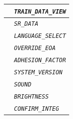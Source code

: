 \documentclass{template/openetcs}
\begin{document}
\begin{itemize}
\begin{longtable}{|l|l|}
				\hline
				
				&	\begin{minipage}[t]{0.78\linewidth} \emph{\texttt{TRAIN\_DATA\_VIEW}} \end{minipage} \\
				
				\hline
				
				&	\begin{minipage}[t]{0.78\linewidth} \emph{\texttt{SR\_DATA}} \end{minipage} \\
				
				\hline
				
				&	\begin{minipage}[t]{0.78\linewidth} \emph{\texttt{LANGUAGE\_SELECT}} \end{minipage} \\
				
				\hline
				
				&	\begin{minipage}[t]{0.78\linewidth} \emph{\texttt{OVERRIDE\_EOA}} \end{minipage} \\
				
				\hline
				
				&	\begin{minipage}[t]{0.78\linewidth} \emph{\texttt{ADHESION\_FACTOR}} \end{minipage} \\
				
				\hline
				
				&	\begin{minipage}[t]{0.78\linewidth} \emph{\texttt{SYSTEM\_VERSION}} \end{minipage} \\
				
				\hline
				
				&	\begin{minipage}[t]{0.78\linewidth} \emph{\texttt{SOUND}} \end{minipage} \\
				
				\hline
				
				&	\begin{minipage}[t]{0.78\linewidth} \emph{\texttt{BRIGHTNESS}} \end{minipage} \\
				
				\hline
				
				&	\begin{minipage}[t]{0.78\linewidth} \emph{\texttt{CONFIRM\_INTEG}} \end{minipage} \\
				

\end{longtable}
\end{itemize}
\end{document}
